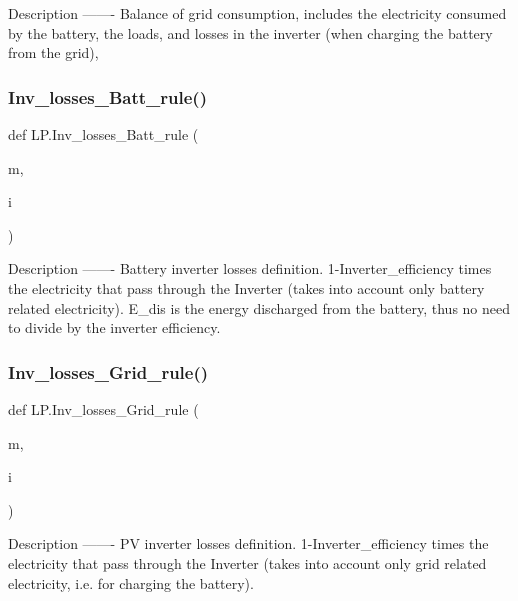\begin{DoxyVerb}Description
-------
Balance of grid consumption, includes the electricity consumed by the battery, the loads, and losses in the inverter (when charging the battery from the grid),
\end{DoxyVerb}
 \mbox{\label{namespace_l_p_ab5baa41892f3e1bd503c0259eb081d7c}} 
\subsubsection{\texorpdfstring{Inv\+\_\+losses\+\_\+\+Batt\+\_\+rule()}{Inv\_losses\_Batt\_rule()}}
{\footnotesize\ttfamily def L\+P.\+Inv\+\_\+losses\+\_\+\+Batt\+\_\+rule (\begin{DoxyParamCaption}\item[{}]{m,  }\item[{}]{i }\end{DoxyParamCaption})}

\begin{DoxyVerb}Description
-------
Battery inverter losses definition. 1-Inverter_efficiency times the electricity that pass through the Inverter (takes into account only battery related electricity). E_dis is the energy discharged from the battery, thus no need to divide by the inverter efficiency.
\end{DoxyVerb}
 \mbox{\label{namespace_l_p_aec58b73a9e0936ba025185e9beac66be}} 
\subsubsection{\texorpdfstring{Inv\+\_\+losses\+\_\+\+Grid\+\_\+rule()}{Inv\_losses\_Grid\_rule()}}
{\footnotesize\ttfamily def L\+P.\+Inv\+\_\+losses\+\_\+\+Grid\+\_\+rule (\begin{DoxyParamCaption}\item[{}]{m,  }\item[{}]{i }\end{DoxyParamCaption})}

\begin{DoxyVerb}Description
-------
PV inverter losses definition. 1-Inverter_efficiency times the electricity that pass through the Inverter (takes into account only grid related electricity, i.e. for charging the battery).
\end{DoxyVerb}
 \mbox{\label{namespace_l_p_ad920676464ef0ff1688919b8c81ab873}} 
